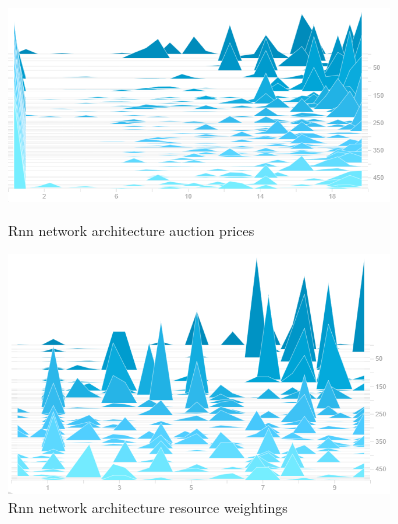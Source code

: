 \begin{figure}
    \centering
    \begin{minipage}{0.45\textwidth}
        \centering
        \includegraphics[width=0.9\textwidth]{figures/net_arch_training_fig/rnn_architecture_auction_prices.png}
        \caption{Rnn network architecture auction prices}
        \label{fig:rnn-auction-prices}
    \end{minipage}\hfill
    \begin{minipage}{0.45\textwidth}
        \centering
        \includegraphics[width=0.9\textwidth]{figures/net_arch_training_fig/rnn_architecture_weightings.png}
        \caption{Rnn network architecture resource weightings}
        \label{fig:rnn-resource-weightings}
    \end{minipage}
\end{figure}

